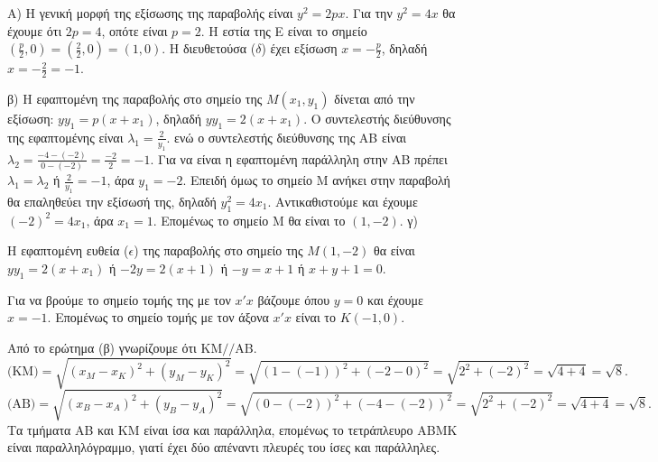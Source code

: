 Α) Η γενική μορφή της εξίσωσης της παραβολής είναι $y^2 = 2px$. Για την $y^2 = 4x$ θα έχουμε ότι $2p = 4$, οπότε είναι $p = 2$.
Η εστία της Ε είναι το σημείο $\left(\frac{p}{2}, 0\right) = \left(\frac{2}{2}, 0\right) = (1,0)$.
Η διευθετούσα ($\delta$) έχει εξίσωση $x = -\frac{p}{2}$, δηλαδή $x = -\frac{2}{2} = -1$.

β) Η εφαπτομένη της παραβολής στο σημείο της $M(x_1,y_1)$ δίνεται από την εξίσωση: $yy_1 = p(x + x_1)$, δηλαδή $yy_1 = 2(x + x_1)$.
Ο συντελεστής διεύθυνσης της εφαπτομένης είναι $\lambda_1 = \frac{2}{y_1}$.
ενώ ο συντελεστής διεύθυνσης της ΑΒ είναι $\lambda_2 = \frac{-4 - (-2)}{0 - (-2)} = \frac{-2}{2} = -1$.
Για να είναι η εφαπτομένη παράλληλη στην ΑΒ πρέπει $\lambda_1 = \lambda_2$ ή $\frac{2}{y_1} = -1$, άρα $y_1 = -2$.
Επειδή όμως το σημείο M ανήκει στην παραβολή θα επαληθεύει την εξίσωσή της, δηλαδή $y_1^2 = 4x_1$. Αντικαθιστούμε και έχουμε $(-2)^2 = 4x_1$, άρα $x_1 = 1$.
Επομένως το σημείο Μ θα είναι το $(1,-2)$.
γ)


Η εφαπτομένη ευθεία ($\epsilon$) της παραβολής στο σημείο της $M(1,-2)$ θα είναι $y y_1 = 2(x + x_1)$ ή $-2y = 2(x + 1)$ ή $-y = x + 1$ ή $x + y + 1 = 0$.

Για να βρούμε το σημείο τομής της με τον $x'x$ βάζουμε όπου $y = 0$ και έχουμε $x = -1$.
Επομένως το σημείο τομής με τον άξονα $x'x$ είναι το $K(-1,0)$.

Από το ερώτημα (β) γνωρίζουμε ότι $\text{KM} \text{//} \text{AB}$.
\[ \text{(KM)} = \sqrt{(x_M - x_K)^2 + (y_M - y_K)^2} = \sqrt{(1 - (-1))^2 + (-2 - 0)^2} = \sqrt{2^2 + (-2)^2} = \sqrt{4 + 4} = \sqrt{8}. \]
\[ \text{(AB)} = \sqrt{(x_B - x_A)^2 + (y_B - y_A)^2} = \sqrt{(0 - (-2))^2 + (-4 - (-2))^2} = \sqrt{2^2 + (-2)^2} = \sqrt{4 + 4} = \sqrt{8}. \]
Τα τμήματα ΑΒ και ΚΜ είναι ίσα και παράλληλα, επομένως το τετράπλευρο ABMK είναι παραλληλόγραμμο, γιατί έχει δύο απέναντι πλευρές του ίσες και παράλληλες.
\endlysh